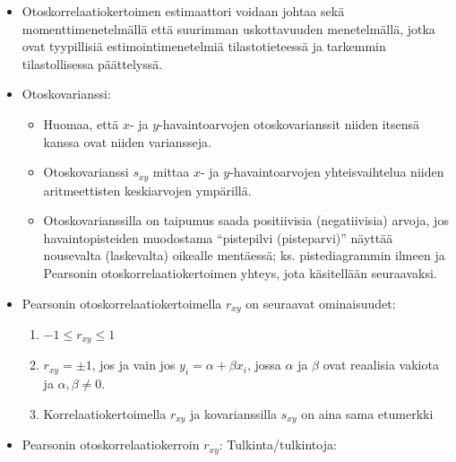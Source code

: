 \documentclass[
]{book}
\providecommand{\tightlist}{%
  \setlength{\itemsep}{0pt}\setlength{\parskip}{0pt}}
\begin{document}
\begin{itemize}
\item
  Otoskorrelaatiokertoimen estimaattori voidaan johtaa sekä momenttimenetelmällä että suurimman uskottavuuden menetelmällä, jotka ovat tyypillisiä estimointimenetelmiä tilastotieteessä ja tarkemmin tilastollisessa päättelyssä.
\item
  Otoskovarianssi:

  \begin{itemize}
  \tightlist
  \item
    Huomaa, että \(x\)- ja \(y\)-havaintoarvojen otoskovarianssit niiden itsensä kanssa ovat niiden variansseja.
  \item
    Otoskovarianssi \(s_{xy}\) mittaa \(x\)- ja \(y\)-havaintoarvojen yhteisvaihtelua niiden aritmeettisten keskiarvojen ympärillä.
  \item
    Otoskovarianssilla on taipumus saada positiivisia (negatiivisia) arvoja, jos havaintopisteiden muodostama ``pistepilvi (pisteparvi)'' näyttää nousevalta (laskevalta) oikealle mentäessä; ks. pistediagrammin ilmeen ja Pearsonin otoskorrelaatiokertoimen yhteys, jota käsitellään seuraavaksi.
  \end{itemize}
\item
  Pearsonin otoskorrelaatiokertoimella \(r_{xy}\) on seuraavat ominaisuudet:

  \begin{enumerate}
  \def\labelenumi{\roman{enumi})}
  \tightlist
  \item
    \(-1 \le r_{xy} \le 1\)
  \item
    \(r_{xy} = \pm 1\), jos ja vain jos \(y_i = \alpha + \beta x_i\), jossa \(\alpha\) ja \(\beta\) ovat reaalisia vakiota ja \(\alpha,\beta \neq 0\).
  \item
    Korrelaatiokertoimella \(r_{xy}\) ja kovarianssilla \(s_{xy}\) on aina sama etumerkki
  \end{enumerate}
\item
  Pearsonin otoskorrelaatiokerroin \(r_{xy}\): Tulkinta/tulkintoja:


\end{itemize}
\end{document}

